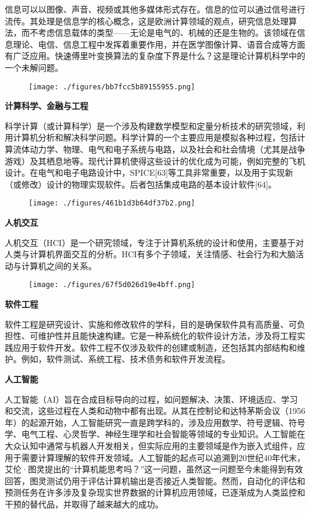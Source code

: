 信息可以以图像、声音、视频或其他多媒体形式存在。信息的位可以通过信号进行流传。其处理是信息学的核心概念，这是欧洲计算领域的观点，研究信息处理算法，而不考虑信息载体的类型——无论是电气的、机械的还是生物的。该领域在信息理论、电信、信息工程中发挥着重要作用，并在医学图像计算、语音合成等方面有广泛应用。快速傅里叶变换算法的复杂度下界是什么？这是理论计算机科学中的一个未解问题。
\begin{figure}[ht]
\centering
\texttt{[image: ./figures/bb7fcc5b89155955.png]}
\caption{} \label{fig_JSS_9}
\end{figure}
\textbf{计算科学、金融与工程}  

科学计算（或计算科学）是一个涉及构建数学模型和定量分析技术的研究领域，利用计算机分析和解决科学问题。科学计算的一个主要应用是模拟各种过程，包括计算流体动力学、物理、电气和电子系统与电路，以及社会和社会情境（尤其是战争游戏）及其栖息地等。现代计算机使得这些设计的优化成为可能，例如完整的飞机设计。在电气和电子电路设计中，SPICE[63]等工具非常重要，以及用于实现新（或修改）设计的物理实现软件。后者包括集成电路的基本设计软件[64]。
\begin{figure}[ht]
\centering
\texttt{[image: ./figures/461b1d3b64df37b2.png]}
\caption{} \label{fig_JSS_10}
\end{figure}
\textbf{人机交互} 

人机交互（HCI）是一个研究领域，专注于计算机系统的设计和使用，主要基于对人类与计算机界面交互的分析。HCI有多个子领域，关注情感、社会行为和大脑活动与计算机之间的关系。
\begin{figure}[ht]
\centering
\texttt{[image: ./figures/67f5d026d19e4bff.png]}
\caption{} \label{fig_JSS_11}
\end{figure}
\textbf{软件工程}  
  
软件工程是研究设计、实施和修改软件的学科，目的是确保软件具有高质量、可负担性、可维护性并且能快速构建。它是一种系统化的软件设计方法，涉及将工程实践应用于软件开发。软件工程不仅涉及软件的创建或制造，还包括其内部结构和维护。例如，软件测试、系统工程、技术债务和软件开发流程。

\textbf{人工智能}  
  
人工智能（AI）旨在合成目标导向的过程，如问题解决、决策、环境适应、学习和交流，这些过程在人类和动物中都有出现。从其在控制论和达特茅斯会议（1956年）的起源开始，人工智能研究一直是跨学科的，涉及应用数学、符号逻辑、符号学、电气工程、心灵哲学、神经生理学和社会智能等领域的专业知识。人工智能在大众认知中通常与机器人开发相关，但实际应用的主要领域是作为嵌入式组件，应用于需要计算理解的软件开发领域。人工智能的起点可以追溯到20世纪40年代末，艾伦·图灵提出的“计算机能思考吗？”这一问题，虽然这一问题至今未能得到有效回答，图灵测试仍用于评估计算机输出是否接近人类智能。然而，自动化的评估和预测任务在许多涉及复杂现实世界数据的计算机应用领域，已逐渐成为人类监控和干预的替代品，并取得了越来越大的成功。
